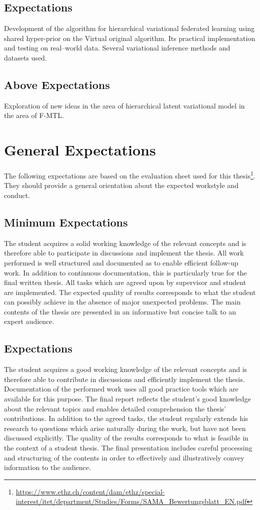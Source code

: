 \documentclass{article}
\begin{document}
\subsection*{Expectations}
Development of the algorithm for hierarchical variational federated learning using shared hyper-prior on the Virtual original algorithm. Its practical implementation and testing on real--world data. Several variational inference methods and datasets used.

\subsection*{Above Expectations}
Exploration of new ideas in the area of hierarchical latent variational model in the area of F-MTL.

\section*{General Expectations}
The following expectations are based on the evaluation sheet used for this thesis\footnote{\url{https://www.ethz.ch/content/dam/ethz/special-interest/itet/department/Studies/Forms/SAMA_Bewertungsblatt_EN.pdf}}. They should provide a general orientation about the expected workstyle and conduct.

\subsection*{Minimum Expectations}
The student acquires a solid working knowledge of the relevant concepts and is therefore able to participate in discussions and implement the thesis.
All work performed is well structured and documented as to enable efficient follow-up work. In addition to continuous documentation, this is particularly true for the final written thesis.
All tasks which are agreed upon by supervisor and student are implemented.
The expected quality of results  corresponds to what the student can possibly achieve in the absence of major unexpected problems.
The main contents of the thesis are presented in an informative but concise talk to an expert audience.

\subsection*{Expectations}
The student acquires a good working knowledge of the relevant concepts and is therefore able to contribute in discussions and efficiently implement the thesis.
Documentation of the performed work uses all good practice tools which are available for this purpose. The final report reflects the student's good knowledge about the relevant topics and enables detailed comprehension the thesis' contributions.
In addition to the agreed tasks, the student regularly extends his research to questions which arise naturally during the work, but have not been discussed explicitly.
The quality of the results corresponds to what is feasible in the context of a student thesis.
The final presentation includes careful processing and structuring of the contents in order to effectively and illustratively convey information to the audience.
\end{document}
